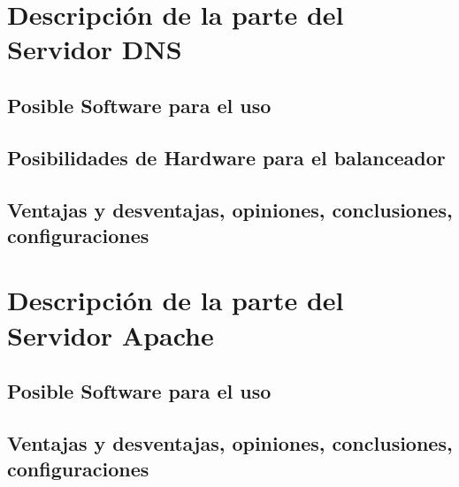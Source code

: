 %

\section{Descripción de la parte del Servidor DNS}

\subsection{Posible Software para el uso}

\subsection{Posibilidades de Hardware para el balanceador}

\subsection{Ventajas y desventajas, opiniones, conclusiones, configuraciones}

\section{Descripción de la parte del Servidor Apache}

\subsection{Posible Software para el uso}

\subsection{Ventajas y desventajas, opiniones, conclusiones, configuraciones}

